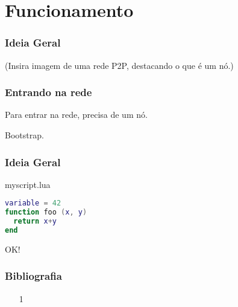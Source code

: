 \documentclass[brazil]{beamer}
\begin{document}
\section{Funcionamento}
\begin{frame}
  \frametitle{Ideia Geral}
  (Insira imagem de uma rede P2P, destacando o que é um nó.)
\end{frame}
\begin{frame}
  \frametitle{Entrando na rede}
  Para entrar na rede, precisa de um nó.
  
  Bootstrap.
\end{frame}

\begin{frame}[fragile]
  \frametitle{Ideia Geral}
  \pause
  \begin{block}{myscript.lua}
    \begin{lstlisting}[language=lua]
variable = 42
function foo (x, y)
  return x+y
end
    \end{lstlisting}
  \end{block}
\end{frame}
\begin{frame}
  \begin{center}
    \LARGE OK!
  \end{center}
\end{frame}
\begin{frame}
  \frametitle{Bibliografia}
  \begin{itemize}
    \footnotesize
    \item[1]
    \vspace{1em}
  \end{itemize}
\end{frame}
\end{document}
